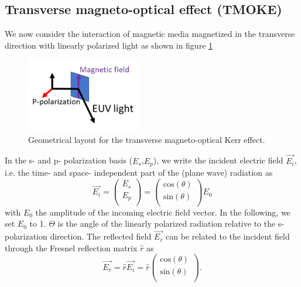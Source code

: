 \subsection{Transverse magneto-optical effect (TMOKE)}
 
We now consider the interaction of magnetic media magnetized in the transverse direction with linearly polarized light as shown in figure \ref{fig:TMOKEGeometry}

\begin{figure}
	\begin{center}
		\includegraphics[width=50mm]{figs/TMOKEGeometry.pdf}
	\end{center}
	\caption{Geometrical layout for the transverse magneto-optical Kerr effect.}
	\label{fig:TMOKEGeometry}
\end{figure}

In the s- and p- polarization basis ($E_s$,$E_p$), we write the incident electric field $\vec{E_i}$, i.e. the time- and space- independent part of the (plane wave) radiation as
\begin{equation}
\overrightarrow{E_i} = \left({\begin{array}{c}
	E_s \\
	E_p \\
	\end{array} } \right) 
= \left({\begin{array}{c}
	\text{cos}(\theta) \\
	\text{sin}(\theta) \\
	\end{array} } \right) E_0
\end{equation}
with $E_0$ the amplitude of the incoming electric field vector. In the following, we set $E_0$ to 1. $\Theta$ is the angle of the linearly polarized radiation relative to the s-polarization direction. The reflected field $\overrightarrow{E_r}$ can be related to the incident field through the Fresnel reflection matrix $\hat{r}$ as
\begin{equation}
\overrightarrow{E_r} = \hat{r}\overrightarrow{E_i}=\hat{r}\left({\begin{array}{c}
	\text{cos}(\theta) \\
	\text{sin}(\theta) \\
	\end{array} } \right) .
\end{equation}


